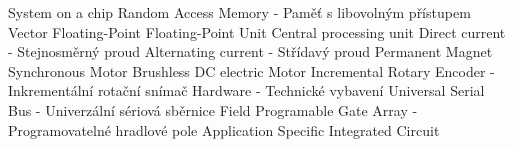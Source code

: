  {System on a chip}
 {Random Access Memory - Paměť s libovolným přístupem}
 {Vector Floating-Point}
 {Floating-Point Unit}
 {Central processing unit}
 {Direct current - Stejnosměrný proud}
 {Alternating current - Střídavý proud}
 {Permanent Magnet Synchronous Motor}
 {Brushless DC electric Motor}
 {Incremental Rotary Encoder - Inkrementální rotační snímač}
 {Hardware - Technické vybavení}
 {Universal Serial Bus - Univerzální sériová sběrnice}
 {Field Programable Gate Array - Programovatelné hradlové pole}
 {Application Specific Integrated Circuit}